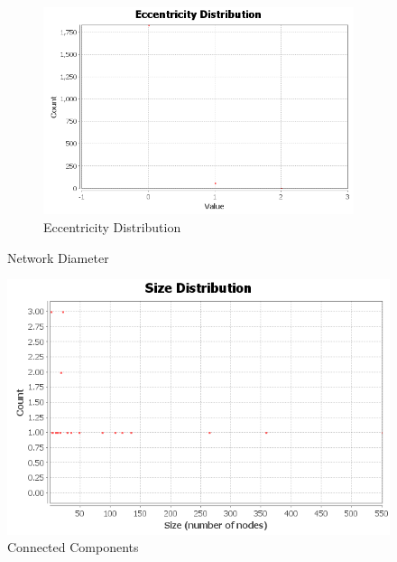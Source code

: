 \documentclass[a4paper,12pt]{article}
\begin{document}
\begin{figure}
         \begin{subfigure}[c]{0.675\textwidth}
                \includegraphics[width=\textwidth]{EccentricityDistribution.png}
                \caption{Eccentricity Distribution}
                
        \end{subfigure}%
        \caption{Network Diameter}
\end{figure}
\begin{figure}
\center
\includegraphics[width=\linewidth]{cc-size-distribution.png} 
\caption{Connected Components}
\end{figure}
\end{document}
